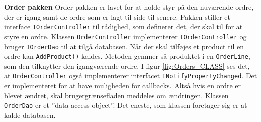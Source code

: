 \textbf{Order pakken}\newline
Order pakken er lavet for at holde styr på den nuværende ordre, der er igang samt de ordre som er lagt til side til senere.
Pakken stiller et interface \texttt{IOrderController} til rådighed, som definerer det, der skal til for at styre en ordre.
Klassen \texttt{OrderController} implementerer \texttt{IOrderController} og bruger \texttt{IOrderDao} til at tilgå databasen.
Når der skal tilføjes et product til en ordre kan \texttt{AddProduct()} kaldes. Metoden gemmer så produktet i en \texttt{OrderLine}, som den tilknytter den igangværende ordre.
\newline\newline
I figur \ref{fig:Orders_CLASS} ses det, at \texttt{OrderController} også implementerer interfacet \texttt{INotifyPropertyChanged}. Det er implementeret for at have muligheden for callbacks. Altså hvis en ordre er blevet ændret, skal brugergrænsefladen meddeles om ændringen.
Klassen \texttt{OrderDao} er et ''data access object''. Det eneste, som klassen foretager sig er at kalde databasen.


